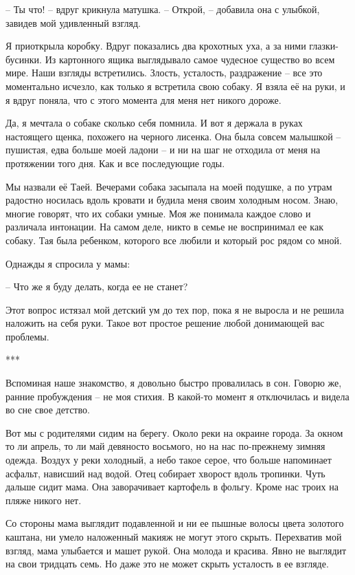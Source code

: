 \documentclass[
]{book}
\begin{document}
-- Ты что! -- вдруг крикнула матушка. -- Открой, -- добавила она с улыбкой, завидев мой удивленный взгляд.

Я приоткрыла коробку. Вдруг показались два крохотных уха, а за ними глазки-бусинки. Из картонного ящика выглядывало самое чудесное существо во всем мире. Наши взгляды встретились. Злость, усталость, раздражение -- все это моментально исчезло, как только я встретила свою собаку. Я взяла её на руки, и я вдруг поняла, что с этого момента для меня нет никого дороже.

Да, я мечтала о собаке сколько себя помнила. И вот я держала в руках настоящего щенка, похожего на черного лисенка. Она была совсем малышкой -- пушистая, едва больше моей ладони -- и ни на шаг не отходила от меня на протяжении того дня. Как и все последующие годы.

Мы назвали её Таей. Вечерами собака засыпала на моей подушке, а по утрам радостно носилась вдоль кровати и будила меня своим холодным носом. Знаю, многие говорят, что их собаки умные. Моя же понимала каждое слово и различала интонации. На самом деле, никто в семье не воспринимал ее как собаку. Тая была ребенком, которого все любили и который рос рядом со мной.

Однажды я спросила у мамы:

-- Что же я буду делать, когда ее не станет?

Этот вопрос истязал мой детский ум до тех пор, пока я не выросла и не решила наложить на себя руки. Такое вот простое решение любой донимающей вас проблемы.

***

Вспоминая наше знакомство, я довольно быстро провалилась в сон. Говорю же, ранние пробуждения -- не моя стихия. В какой-то момент я отключилась и видела во сне свое детство.

Вот мы с родителями сидим на берегу. Около реки на окраине города. За окном то ли апрель, то ли май девяносто восьмого, но на нас по-прежнему зимняя одежда. Воздух у реки холодный, а небо такое серое, что больше напоминает асфальт, нависший над водой. Отец собирает хворост вдоль тропинки. Чуть дальше сидит мама. Она заворачивает картофель в фольгу. Кроме нас троих на пляже никого нет.

Со стороны мама выглядит подавленной и ни ее пышные волосы цвета золотого каштана, ни умело наложенный макияж не могут этого скрыть. Перехватив мой взгляд, мама улыбается и машет рукой. Она молода и красива. Явно не выглядит на свои тридцать семь. Но даже это не может скрыть усталость в ее взгляде.
\end{document}
